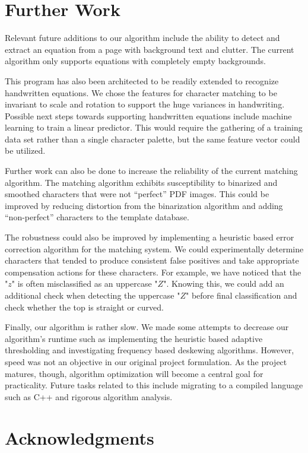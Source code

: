\documentclass[journal]{IEEEtran}
\begin{document}
\section{Further Work}
Relevant future additions to our algorithm include the ability to detect and extract an equation from a page with background text and clutter. The current algorithm only supports equations with completely empty backgrounds.

This program has also been architected to be readily extended to recognize handwritten equations. We chose the features for character matching to be invariant to scale and rotation to support the huge variances in handwriting. Possible next steps towards supporting handwritten equations include machine learning to train a linear predictor. This would require the gathering of a training data set rather than a single character palette, but the same feature vector could be utilized.

Further work can also be done to increase the reliability of the current matching algorithm. The matching algorithm exhibits susceptibility to binarized and smoothed characters that were not “perfect” PDF images. This could be improved by reducing distortion from the binarization algorithm and adding “non-perfect” characters to the template database. 

The robustness could also be improved by implementing a heuristic based error correction algorithm for the matching system. We could experimentally determine characters that tended to produce consistent false positives and take appropriate compensation actions for these characters. For example, we have noticed that the "$z$"  is often misclassified as an uppercase "$Z$". Knowing this, we could add an additional check when detecting the uppercase "$Z$"  before final classification and check whether the top is straight or curved.

Finally, our algorithm is rather slow. We made some attempts to decrease our algorithm's runtime such as implementing the heuristic based adaptive thresholding and investigating frequency based deskewing algorithms\cite{Kaur:article_typical}. However, speed was not an objective in our original project formulation. As the project matures, though, algorithm optimization will become a central goal for practicality. Future tasks related to this include migrating to a compiled language such as C++ and rigorous algorithm analysis.




\section*{Acknowledgments}
\end{document}

